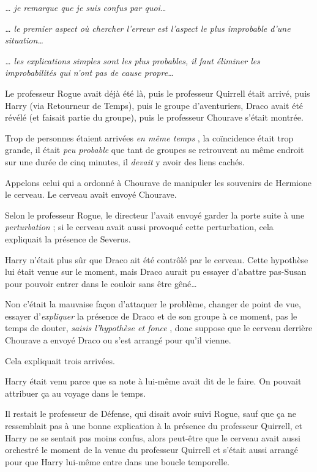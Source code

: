 \emph{… je remarque que je suis confus par quoi…} 

\emph{… le premier aspect où chercher l'erreur est l'aspect le plus improbable d'une situation…} 

\emph{… les explications simples sont les plus probables, il faut éliminer les improbabilités qui n'ont pas de cause propre…} 

Le professeur Rogue avait déjà été là, puis le professeur Quirrell était arrivé, puis Harry (via Retourneur de Temps), puis le groupe d'aventuriers, Draco avait été révélé (et faisait partie du groupe), puis le professeur Chourave s'était montrée.

Trop de personnes étaient arrivées \emph{en même temps} , la coïncidence était trop grande, il était \emph{peu probable}  que tant de groupes se retrouvent au même endroit sur une durée de cinq minutes, il \emph{devait}  y avoir des liens cachés.

Appelons celui qui a ordonné à Chourave de manipuler les souvenirs de Hermione le cerveau. Le cerveau avait envoyé Chourave.

Selon le professeur Rogue, le directeur l'avait envoyé garder la porte suite à une \emph{perturbation}  ; si le cerveau avait aussi provoqué cette perturbation, cela expliquait la présence de Severus.

Harry n'était plus sûr que Draco ait été contrôlé par le cerveau. Cette hypothèse lui était venue sur le moment, mais Draco aurait pu essayer d'abattre pas-Susan pour pouvoir entrer dans le couloir sans être gêné…

Non c'était la mauvaise façon d'attaquer le problème, changer de point de vue, essayer d'\emph{expliquer}  la présence de Draco et de son groupe à ce moment, pas le temps de douter, \emph{saisis l'hypothèse et fonce} , donc suppose que le cerveau derrière Chourave a envoyé Draco ou s'est arrangé pour qu'il vienne.

Cela expliquait trois arrivées.

Harry était venu parce que sa note à lui-même avait dit de le faire. On pouvait attribuer ça au voyage dans le temps.

Il restait le professeur de Défense, qui disait avoir suivi Rogue, sauf que ça ne ressemblait pas à une bonne explication à la présence du professeur Quirrell, et Harry ne se sentait pas moins confus, alors peut-être que le cerveau avait aussi orchestré le moment de la venue du professeur Quirrell et s'était aussi arrangé pour que Harry lui-même entre dans une boucle temporelle.

